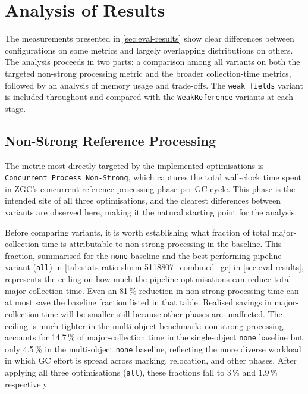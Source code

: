 \chapter{Analysis of Results}
\label{chap:analysis}

The measurements presented in \cref{sec:eval-results} show clear differences between configurations on some metrics and largely overlapping distributions on others. The analysis proceeds in two parts: a comparison among all variants on both the targeted non-strong processing metric and the broader collection-time metrics, followed by an analysis of memory usage and trade-offs. The \texttt{weak\_fields} variant is included throughout and compared with the \texttt{WeakReference} variants at each stage.

\section{Non-Strong Reference Processing}
\label{sec:analysis-nonstrong}

The metric most directly targeted by the implemented optimisations is \texttt{Concurrent Process Non-Strong}, which captures the total wall-clock time spent in \ac{ZGC}'s concurrent reference-processing phase per \ac{GC} cycle. This phase is the intended site of all three optimisations, and the clearest differences between variants are observed here, making it the natural starting point for the analysis.

Before comparing variants, it is worth establishing what fraction of total major-collection time is attributable to non-strong processing in the baseline. This fraction, summarised for the \texttt{none} baseline and the best-performing pipeline variant (\texttt{all}) in \cref{tab:stats-ratio-slurm-5118807_combined_gc} in \cref{sec:eval-results}, represents the ceiling on how much the pipeline optimisations can reduce total major-collection time. Even an 81\,\% reduction in non-strong processing time can at most save the baseline fraction listed in that table. Realised savings in major-collection time will be smaller still because other phases are unaffected. The ceiling is much tighter in the multi-object benchmark: non-strong processing accounts for 14.7\,\% of major-collection time in the single-object \texttt{none} baseline but only 4.5\,\% in the multi-object \texttt{none} baseline, reflecting the more diverse workload in which \ac{GC} effort is spread across marking, relocation, and other phases. After applying all three optimisations (\texttt{all}), these fractions fall to 3\,\% and 1.9\,\% respectively.


